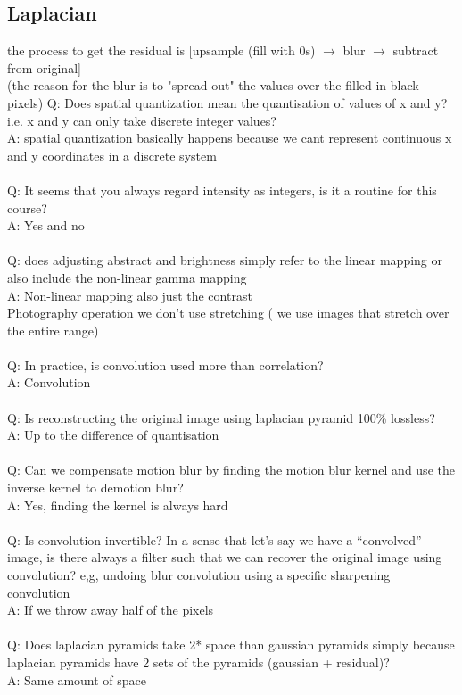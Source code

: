 \documentclass[11pt]{article}
\begin{document}
\subsection*{Laplacian}
the process to get the residual is [upsample (fill with 0s) $\rightarrow$ blur $\rightarrow$ subtract from original]\\
(the reason for the blur is to "spread out" the values over the filled-in black pixels)
\newpage
\noindent
Q: Does spatial quantization mean the quantisation of values of x and y? i.e. x and y can only take discrete integer values?\\
A: spatial quantization basically happens because we cant represent continuous x and y coordinates in a discrete system\\
\\
Q: It seems that you always regard intensity as integers, is it a routine for this course?\\
A: Yes and no\\
\\
Q: does adjusting abstract and brightness simply refer to the linear mapping or also include the non-linear gamma mapping\\
A: Non-linear mapping also just the contrast\\
Photography operation we don’t use stretching ( we use images that stretch over the entire range)
\\\\
Q: In practice, is convolution used more than correlation?\\
A: Convolution\\
\\
Q: Is reconstructing the original image using laplacian pyramid 100\% lossless?\\
A: Up to the difference of quantisation
\\\\
Q: Can we compensate motion blur by finding the motion blur kernel and use the inverse kernel to demotion blur?\\
A: Yes, finding the kernel is always hard
\\\\
Q: Is convolution invertible? In a sense that let's say we have a “convolved” image, is there always a filter such that we can recover the original image using convolution? e,g, undoing blur convolution using a specific sharpening convolution\\
A: If we throw away half of the pixels
\\\\
Q: Does laplacian pyramids take 2* space than gaussian pyramids simply because laplacian pyramids have 2 sets of the pyramids (gaussian + residual)?\\
A: Same amount of space
\\\\
\end{document}
